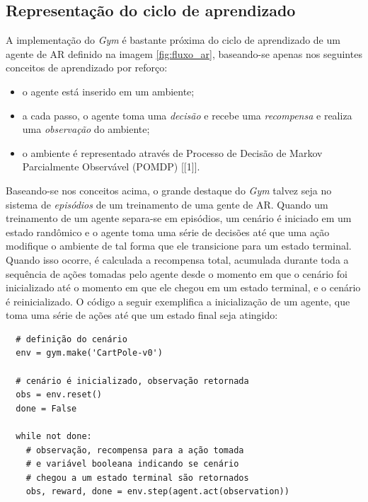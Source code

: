 \documentclass[cic,tc]{iiufrgs}
\begin{document}
\subsection{Representação do ciclo de aprendizado}
A implementação do \textit{Gym} é bastante próxima do ciclo de aprendizado de um
agente de AR definido na imagem \ref{fig:fluxo_ar}, baseando-se apenas nos
seguintes conceitos de aprendizado por reforço:

\begin{itemize}
  \item o agente está inserido em um ambiente;
  \item a cada passo, o agente toma uma \textit{decisão} e recebe uma
        \textit{recompensa} e realiza uma \textit{observação} do ambiente;
  \item o ambiente é representado através de Processo de Decisão de Markov
  Parcialmente Observável (POMDP) [[1]].
\end{itemize}

Baseando-se nos conceitos acima, o grande destaque do \textit{Gym} talvez seja
no sistema de \textit{episódios} de um treinamento de uma gente de AR. Quando um
treinamento de um agente separa-se em episódios, um cenário é iniciado em um
estado randômico e o agente toma uma série de decisões até que uma ação
modifique o ambiente de tal forma que ele transicione para um estado terminal.
Quando isso ocorre, é calculada a recompensa total, acumulada durante toda a
sequência de ações tomadas pelo agente desde o momento em que o cenário foi
inicializado até o momento em que ele chegou em um estado terminal, e o cenário
é reinicializado.
O código a seguir exemplifica a inicialização de um agente, que toma uma série
de ações até que um estado final seja atingido:

\begin{verbatim}
  # definição do cenário
  env = gym.make('CartPole-v0')

  # cenário é inicializado, observação retornada
  obs = env.reset()
  done = False

  while not done:
    # observação, recompensa para a ação tomada
    # e variável booleana indicando se cenário
    # chegou a um estado terminal são retornados
    obs, reward, done = env.step(agent.act(observation))
\end{verbatim}
\end{document}
